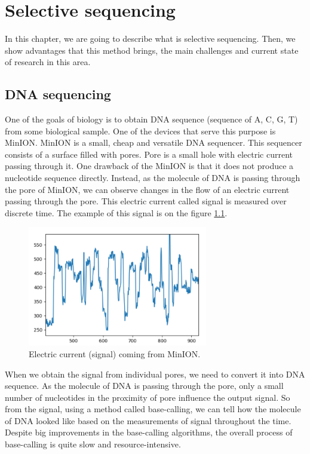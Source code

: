 \chapter{Selective sequencing}

\label{kap:selSeq} %

In this chapter, we are going to describe what is selective sequencing. Then, we
show advantages that this method brings, the main challenges and current state of
research in this area.

\section{DNA sequencing}

One of the goals of biology is to obtain DNA sequence (sequence of A, C, G, T)
from some biological sample. One of the devices that serve this purpose is MinION\cite{lu2016oxford}.
MinION is a small, cheap and versatile DNA sequencer. This sequencer consists of a surface
filled with pores. Pore is a small hole with electric current passing through it. 
One drawback of the MinION is that it does not produce a nucleotide sequence directly.
Instead, as the molecule of DNA is passing through the pore of MinION, we can observe
changes in the flow of an electric current passing through the pore. This electric
current called signal is measured over discrete time. The example of this signal
is on the figure \ref{obr:minIonCurrent}.

\begin{figure}
\centerline{\includegraphics[width=0.7\textwidth, height=0.3\textheight]{images/signal}}
\caption[MinION signal]{Electric current (signal) coming from MinION.}
\label{obr:minIonCurrent}
\end{figure}

When we obtain the signal from individual pores, we need to convert it into DNA
sequence. As the molecule of DNA is passing through the pore, only a small
number of nucleotides in the proximity of pore influence the output signal. So from
the signal, using a method called base-calling, we can tell how the molecule of DNA
looked like based on the measurements of signal throughout the time. Despite big
improvements in the base-calling algorithms, the overall process of base-calling
is quite slow and resource-intensive.

